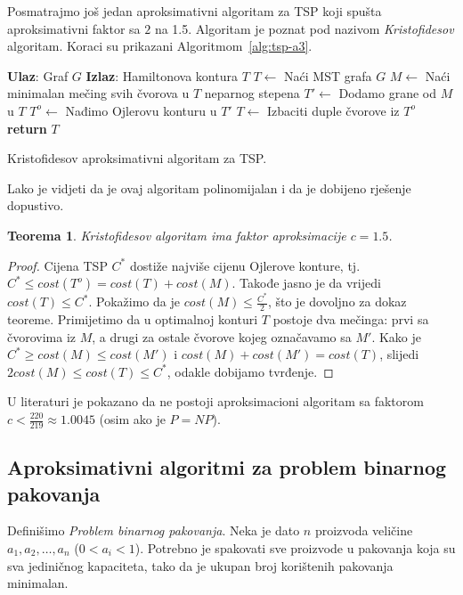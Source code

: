 \documentclass[a4paper, utf8, 11pt, colorlinks]{book}
\newtheorem{thm}{Teorema}[chapter]
\theoremstyle{definition}
\begin{document}
Posmatrajmo još jedan aproksimativni algoritam za TSP koji spušta aproksimativni faktor sa $2$ na 1.5. Algoritam je poznat pod nazivom \emph{Kristofidesov} algoritam.
Koraci su prikazani Algoritmom~\ref{alg:tsp-a3}.

\begin{algorithm}[H] 

	\begin{algorithmic}[1]
		\STATE \textbf{Ulaz}: Graf $G$
		\STATE \textbf{Izlaz}: Hamiltonova kontura $T$ 
		\STATE $T \gets$ Naći MST grafa $G$
		\STATE $M \gets$ Naći minimalan mečing svih čvorova u $T$ neparnog stepena
		\STATE $T' \gets$ Dodamo grane od $M$ u $T$
		\STATE $T^o\gets$ Nađimo Ojlerovu konturu u $T'$
		\STATE $T \gets$ Izbaciti duple čvorove iz $T^o$
		\STATE \textbf{return} $T$
	\end{algorithmic}	
    \caption{Kristofidesov aproksimativni algoritam za TSP.}
    \label{alg:tsp-a3}
\end{algorithm}
  Lako je vidjeti da je ovaj algoritam polinomijalan i da je dobijeno rješenje dopustivo. 
  \begin{thm}
  	  Kristofidesov algoritam ima faktor aproksimacije $c=1.5$.
  \end{thm}
\begin{proof}
  Cijena TSP $C^*$ dostiže najviše cijenu Ojlerove konture, tj.  $C^*\leq cost(T^o) = cost(T) + cost(M)$.  Takođe jasno je da vrijedi $cost(T) \leq C^*$. Pokažimo da je $cost(M) \leq  \frac{C^*}{2}$, što je dovoljno za dokaz teoreme. Primijetimo da u optimalnoj konturi $T$ postoje dva mečinga: prvi sa čvorovima iz $M$, a drugi za ostale čvorove kojeg označavamo sa $M'$. 
  Kako je $C^* \geq cost(M) \leq cost(M')$ i $cost(M) + cost(M') = cost(T)$, slijedi 
  $2 cost(M) \leq cost(T) \leq C^*$, odakle dobijamo tvrđenje.  
\end{proof} 

U literaturi je pokazano da ne postoji  aproksimacioni algoritam sa faktorom  $c < \frac{220}{219} \approx 1.0045$ (osim ako je $P=NP$). 
 
 
 \subsection{Aproksimativni algoritmi za problem binarnog pakovanja}\label{sec:binpack}

Definišimo \emph{Problem binarnog pakovanja}.  Neka je dato $n$ proizvoda veličine $a_1,a_2,\ldots,a_n$ ($0<a_i<1$). Potrebno je spakovati sve proizvode u pakovanja koja su sva jediničnog kapaciteta, tako da je ukupan broj korištenih pakovanja  minimalan.  
\end{document}
